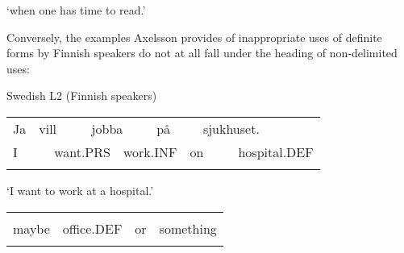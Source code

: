 \begin{styleTranslation}
‘when one has time to read.’

\end{styleTranslation}

Conversely, the examples Axelsson provides of inappropriate uses of definite forms by Finnish speakers do not at all fall under the heading of non-delimited uses:


\begin{listWWNumileveli}
\item {}

\begin{styleExample}
\label{bkm:Ref115686476}Swedish L2 (Finnish speakers)

\end{styleExample}

\end{listWWNumileveli}

\begin{listWWNumlvileveli}
\item {}

\end{listWWNumlvileveli}

\begin{tabular}{llllllllll}
\lsptoprule
Ja & \multicolumn{2}{l}{vill

} & \multicolumn{2}{l}{jobba

} & \multicolumn{2}{l}{på

} & \multicolumn{2}{l}{sjukhuset.

} & \\
\multicolumn{2}{l}{I

} & \multicolumn{2}{l}{want.PRS

} & \multicolumn{2}{l}{work.INF

} & \multicolumn{2}{l}{on

} & \multicolumn{2}{l}{hospital.DEF

}\\
\lspbottomrule
\end{tabular}

\begin{styleTranslation}
‘I want to work at a hospital.’

\end{styleTranslation}

\begin{tabular}{llll}
\lsptoprule
\multicolumn{4}{l}{kanske

}\\
maybe & office.DEF & or & something\\
\lspbottomrule
\end{tabular}

